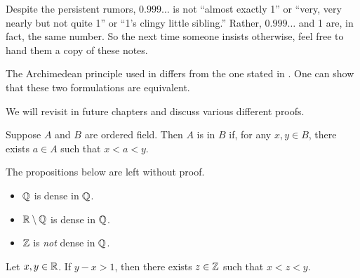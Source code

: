 \begin{remark}
  Despite the persistent rumors, $0.999\ldots$ is not
  ``almost exactly 1'' or ``very, very nearly but not quite 1'' or
  ``1's clingy little sibling.'' Rather, $0.999\ldots$ and 1 are, in
  fact, the same number. So the next time someone insists otherwise,
  feel free to hand them a copy of these notes.
\end{remark}

\begin{remark}
  The Archimedean principle used in  differs from
  the one stated in . One can show that
  these two formulations are equivalent.
\end{remark}

\begin{remark}
  We will revisit  in future chapters and discuss
  various different proofs.
\end{remark}

\begin{definition}[Density]
  Suppose $A$ and $B$ are ordered field. Then $A$ is  in
  $B$ if, for any $x, y \in B$, there exists $a \in A$ such that $x < a < y$.
\end{definition}

\begin{example}
  The propositions below are left without proof.
  \begin{itemize}
    \item $\mathbb Q$ is dense in $\mathbb Q$.
    \item $\mathbb R \setminus \mathbb Q$ is dense in $\mathbb Q$.
    \item $\mathbb Z$ is \textit{not} dense in $\mathbb Q$.
  \end{itemize}
\end{example}

\begin{lemma}
  Let $x, y \in \mathbb R$. If $y - x > 1$, then there exists $z \in \mathbb Z$
  such that $x < z < y$.
\end{lemma}

